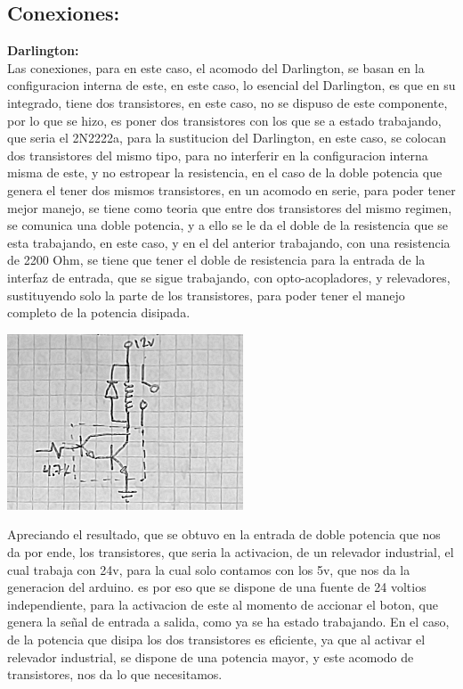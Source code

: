 \documentclass[12pt,a4paper]{article}
\begin{document}
\subsection{Conexiones:}

\textbf{Darlington:}\\

Las conexiones, para en este caso, el acomodo del Darlington, se basan en la configuracion interna de este, en este caso, lo esencial del Darlington, es que en su integrado, tiene dos transistores, en este caso, no se dispuso de este componente, por lo que se hizo, es poner dos transistores con los que se a estado trabajando, que seria el 2N2222a, para la sustitucion del Darlington, en este caso, se colocan dos transistores del mismo tipo, para no interferir en la configuracion interna misma de este, y no estropear la resistencia, en el caso de la doble potencia que genera el tener dos mismos transistores, en un acomodo en serie, para poder tener mejor manejo, se tiene como teoria que entre dos transistores del mismo regimen, se comunica una doble potencia, y a ello se le da el doble de la resistencia que se esta trabajando, en este caso, y en el del anterior trabajando, con una resistencia de 2200 Ohm, se tiene que tener el doble de resistencia para la entrada de la interfaz de entrada, que se sigue trabajando, con opto-acopladores, y relevadores, sustituyendo solo la parte de los transistores, para poder tener el manejo completo de la potencia disipada.\\

\begin{center}
\includegraphics[width=7cm]{esquema.jpeg} 
\end{center}

Apreciando el resultado, que se obtuvo en la entrada de doble potencia que nos da por ende, los transistores, que seria la activacion, de un relevador industrial, el cual trabaja con 24v, para la cual solo contamos con los 5v, que nos da la generacion del arduino. es por eso que se dispone de una fuente de 24 voltios independiente, para la activacion de este al momento de accionar el boton, que genera la señal de entrada a salida, como ya se ha estado trabajando. En el caso, de la potencia que disipa los dos transistores es eficiente, ya que al activar el relevador industrial, se dispone de una potencia mayor, y este acomodo de transistores, nos da lo que necesitamos.\\
\end{document}
